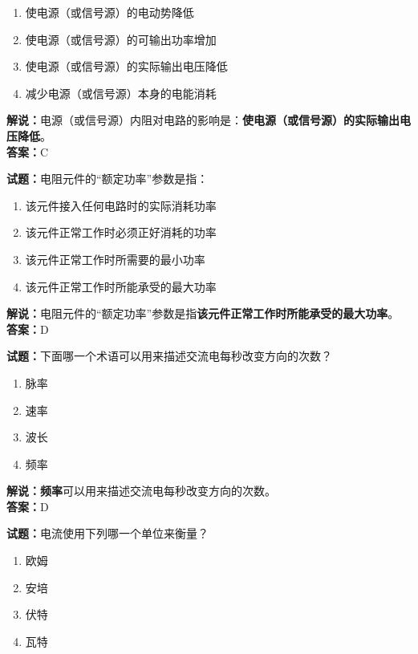 \documentclass{ctexbook}
\begin{document}
\begin{enumerate}[leftmargin=3em]
  \item 使电源（或信号源）的电动势降低
  \item 使电源（或信号源）的可输出功率增加
  \item 使电源（或信号源）的实际输出电压降低
  \item 减少电源（或信号源）本身的电能消耗
\end{enumerate}

\noindent\textbf{解说：}电源（或信号源）内阻对电路的影响是：\textbf{使电源（或信号源）的实际输出电压降低}。\\\noindent\textbf{答案：}C

\bigskip

\noindent\textbf{试题：}电阻元件的“额定功率”参数是指：

\begin{enumerate}[leftmargin=3em]
  \item 该元件接入任何电路时的实际消耗功率
  \item 该元件正常工作时必须正好消耗的功率
  \item 该元件正常工作时所需要的最小功率
  \item 该元件正常工作时所能承受的最大功率
\end{enumerate}

\noindent\textbf{解说：}电阻元件的“额定功率”参数是指\textbf{该元件正常工作时所能承受的最大功率}。\\\noindent\textbf{答案：}D

\bigskip

\noindent\textbf{试题：}下面哪一个术语可以用来描述交流电每秒改变方向的次数？

\begin{enumerate}[leftmargin=3em]
  \item 脉率
  \item 速率
  \item 波长
  \item 频率
\end{enumerate}

\noindent\textbf{解说：}\textbf{频率}可以用来描述交流电每秒改变方向的次数。\cite[137,138]{si}\\
\noindent\textbf{答案：}D

\bigskip

\noindent\textbf{试题：}电流使用下列哪一个单位来衡量？

\begin{enumerate}[leftmargin=3em]
  \item 欧姆
  \item 安培
  \item 伏特
  \item 瓦特
\end{enumerate}
\end{document}

